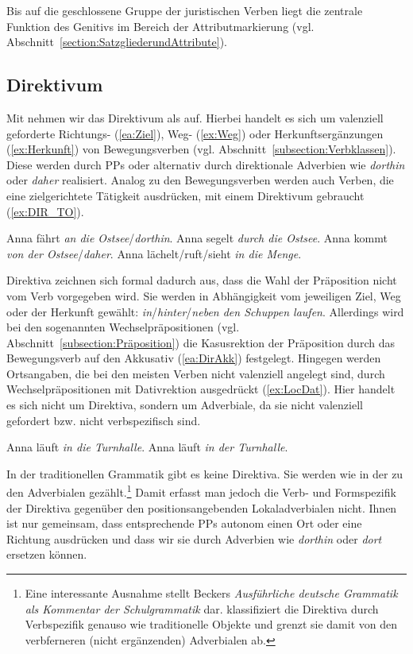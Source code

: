 Bis auf die geschlossene Gruppe der juristischen Verben liegt die zentrale Funktion des Genitivs im Bereich der Attributmarkierung (vgl. Abschnitt~\ref{section:SatzgliederundAttribute}). 


\subsection{Direktivum}\label{subsection:Direktivum}

Mit \citet[1]{Welke2007} nehmen wir das Direktivum als  auf. Hierbei handelt es sich um valenziell geforderte Richtungs- (\ref{ea:Ziel}), Weg- (\ref{ex:Weg}) oder Herkunftsergänzungen (\ref{ex:Herkunft}) von Bewegungsverben (vgl. Abschnitt~\ref{subsection:Verbklassen}). Diese werden durch PPs oder alternativ durch direktionale Adverbien wie \textit{dorthin} oder \textit{daher} realisiert. Analog zu den Bewegungsverben werden auch Verben, die eine zielgerichtete Tätigkeit ausdrücken, mit einem Direktivum gebraucht (\ref{ex:DIR_TO}). 

\ea \label{ea:Direktiva}
\ea \label{ea:Ziel} Anna fährt \textit{an die Ostsee}/\textit{dorthin}.
\ex \label{ex:Weg} Anna segelt \textit{durch die Ostsee}.
\ex \label{ex:Herkunft} Anna kommt \textit{von der Ostsee}/\textit{daher}.  
\ex \label{ex:DIR_TO} Anna lächelt/ruft/sieht \textit{in die Menge}.
\z 
\z 


Direktiva zeichnen sich formal dadurch aus, dass die Wahl der Präposition nicht vom Verb vorgegeben wird. Sie werden in Abhängigkeit vom jeweiligen Ziel, Weg oder der Herkunft gewählt: \textit{in}/\textit{hinter}/\textit{neben den Schuppen laufen}. Allerdings wird bei den sogenannten Wechselpräpositionen (vgl. Abschnitt~\ref{subsection:Präposition}) die Kasusrektion der Präposition durch das Bewegungsverb auf den Akkusativ (\ref{ea:DirAkk}) festgelegt. Hingegen werden Ortsangaben, die bei den meisten Verben nicht valenziell angelegt sind, durch Wechselpräpositionen mit Dativrektion ausgedrückt (\ref{ex:LocDat}). Hier handelt es sich nicht um Direktiva, sondern um Adverbiale, da sie nicht valenziell gefordert bzw. nicht verbspezifisch sind.

\ea \label{ea:DirAkkLocDat}
\ea \label{ea:DirAkk} Anna läuft \textit{in die Turnhalle}.
\ex \label{ex:LocDat} Anna läuft \textit{in der Turnhalle}.
\z 
\z 

In der traditionellen Grammatik gibt es keine Direktiva. Sie werden wie in der \citet[516, §863]{Duden2022} zu den Adverbialen gezählt.\footnote{Eine interessante Ausnahme stellt Beckers \textit{Ausführliche deutsche Grammatik als Kommentar der Schulgrammatik} dar. \citet[112--113]{Becker1837} klassifiziert die Direktiva durch Verbspezifik genauso wie traditionelle Objekte und grenzt sie damit von den verbferneren (nicht ergänzenden) Adverbialen ab.} Damit erfasst man jedoch die Verb- und Formspezifik der Direktiva gegenüber den positionsangebenden Lokaladverbialen nicht. Ihnen ist nur gemeinsam, dass entsprechende PPs autonom einen Ort oder eine Richtung ausdrücken und dass wir sie durch Adverbien wie \textit{dorthin} oder \textit{dort} ersetzen können.

